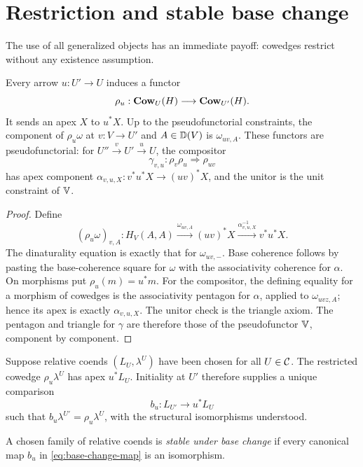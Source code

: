 \section{Restriction and stable base change}
\label{sec:base-change}

The use of all generalized objects has an immediate payoff: cowedges restrict
without any existence assumption.

\begin{proposition}
\label{prop:restriction}
Every arrow \(u:U'\to U\) induces a functor
\[
  \rho_u:\mathbf{Cow}_U(H)\longrightarrow\mathbf{Cow}_{U'}(H).
\]
It sends an apex \(X\) to \(u^*X\).  Up to the pseudofunctorial constraints,
the component of \(\rho_u\omega\) at \(v:V\to U'\) and
\(A\in\mathbb{D}(V)\) is \(\omega_{uv,A}\).  These functors are pseudofunctorial:
for \(U''\xrightarrow{v}U'\xrightarrow{u}U\), the compositor
\[
  \gamma_{v,u}:\rho_v\rho_u\Longrightarrow\rho_{uv}
\]
has apex component
\(\alpha_{v,u,X}:v^*u^*X\to(uv)^*X\), and the unitor is the unit
constraint of \(\mathbb{V}\).
\end{proposition}

\begin{proof}
Define
\[
  (\rho_u\omega)_{v,A}:
  H_V(A,A)\xrightarrow{\omega_{uv,A}}(uv)^*X
  \xrightarrow{\alpha^{-1}_{v,u,X}}v^*u^*X.
\]
The dinaturality equation is exactly that for \(\omega_{uv,-}\).  Base
coherence follows by pasting the base-coherence square for \(\omega\) with
the associativity coherence for \(\alpha\).  On morphisms put
\(\rho_u(m)=u^*m\).  For the compositor, the defining equality for a
morphism of cowedges is the associativity pentagon for \(\alpha\), applied
to \(\omega_{uvz,A}\); hence its apex is exactly
\(\alpha_{v,u,X}\).  The unitor check is the triangle axiom.  The pentagon
and triangle for \(\gamma\) are therefore those of the pseudofunctor
\(\mathbb{V}\), component by component.
\end{proof}

Suppose relative coends \((L_U,\lambda^U)\) have been chosen for all
\(U\in\mathcal{C}\).  The restricted cowedge \(\rho_u\lambda^U\) has apex \(u^*L_U\).
Initiality at \(U'\) therefore supplies a unique comparison
\begin{equation}
  b_u:L_{U'}\longrightarrow u^*L_U
  \label{eq:base-change-map}
\end{equation}
such that \(b_u\lambda^{U'}=\rho_u\lambda^U\), with the structural
isomorphisms understood.

\begin{definition}
\label{def:stable}
A chosen family of relative coends is \emph{stable under base change} if
every canonical map \(b_u\) in \cref{eq:base-change-map} is an isomorphism.
\end{definition}

